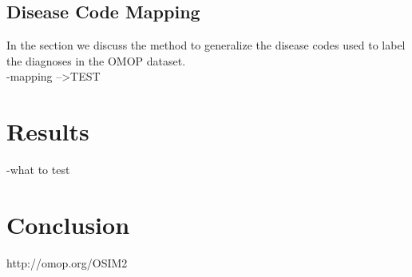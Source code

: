 \subsection{Disease Code Mapping}
\label{sec:mapping}

In the section we discuss the method to generalize the disease codes used to label the diagnoses in the OMOP dataset. \\



-mapping -->TEST


\section{Results}
-what to test

\section{Conclusion}


http://omop.org/OSIM2


